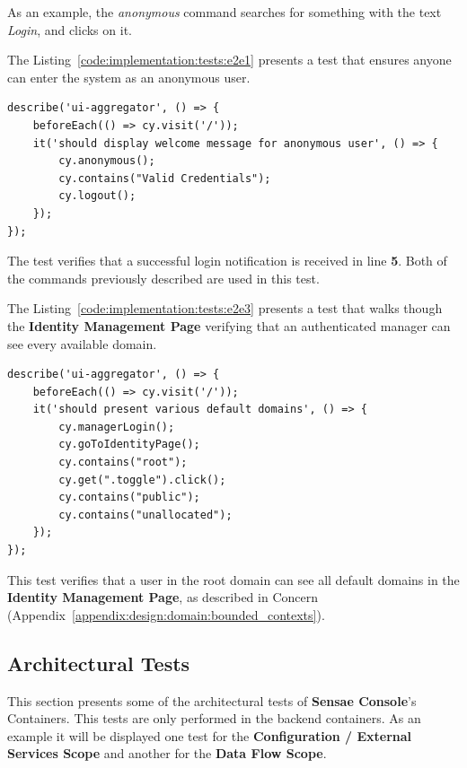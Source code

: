 As an example, the \textit{anonymous} command searches for something with the text \textit{Login}, and clicks on it.

The Listing~\ref{code:implementation:tests:e2e1} presents a test that ensures anyone can enter the system as an anonymous user.

\begin{lstlisting}[style=javascript, caption=End-to-End Test - Anonymous Authentication - \textbf{UI Aggregator}, label={code:implementation:tests:e2e1}]
describe('ui-aggregator', () => {
    beforeEach(() => cy.visit('/'));
    it('should display welcome message for anonymous user', () => {
        cy.anonymous();
        cy.contains("Valid Credentials");
        cy.logout();
    });
});
\end{lstlisting}

The test verifies that a successful login notification is received in line \textbf{5}. Both of the commands previously described are used in this test.

The Listing~\ref{code:implementation:tests:e2e3} presents a test that walks though the \textbf{Identity Management Page} verifying that an authenticated manager can see every available domain.

\begin{lstlisting}[style=javascript, caption=End-to-End Test - Discover Available Domains - \textbf{Identity Management}, label={code:implementation:tests:e2e3}]
describe('ui-aggregator', () => {
    beforeEach(() => cy.visit('/'));
    it('should present various default domains', () => {
        cy.managerLogin();
        cy.goToIdentityPage();
        cy.contains("root");
        cy.get(".toggle").click();
        cy.contains("public");
        cy.contains("unallocated");
    });
});
\end{lstlisting}

This test verifies that a user in the root domain can see all default domains in the \textbf{Identity Management Page}, as described in  Concern  (Appendix~\ref{appendix:design:domain:bounded_contexts}).

\subsection{Architectural Tests}
\label{subsec:implementation:tests:arch}

This section presents some of the architectural tests of \textbf{Sensae Console}'s Containers. This tests are only performed in the backend containers.
As an example it will be displayed one test for the \textbf{Configuration / External Services Scope} and another for the \textbf{Data Flow Scope}.

